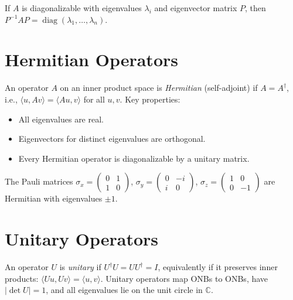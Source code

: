 \begin{example}
If $A$ is diagonalizable with eigenvalues $\lambda_i$ and eigenvector matrix $P$, then $P^{-1}AP = \operatorname{diag}(\lambda_1,\ldots,\lambda_n)$.
\end{example}

\section{Hermitian Operators}
\label{sec:hermitian-ops}

An operator $A$ on an inner product space is \emph{Hermitian} (self-adjoint) if $A=A^\dagger$, i.e., $\langle u,Av\rangle = \langle Au,v\rangle$ for all $u,v$. Key properties:
\begin{itemize}
  \item All eigenvalues are real.
  \item Eigenvectors for distinct eigenvalues are orthogonal.
  \item Every Hermitian operator is diagonalizable by a unitary matrix.
\end{itemize}

\begin{example}
The Pauli matrices $\sigma_x=\begin{pmatrix}0&1\\1&0\end{pmatrix}$, $\sigma_y=\begin{pmatrix}0&-i\\i&0\end{pmatrix}$, $\sigma_z=\begin{pmatrix}1&0\\0&-1\end{pmatrix}$ are Hermitian with eigenvalues $\pm1$.
\end{example}

\section{Unitary Operators}
\label{sec:unitary-ops}

An operator $U$ is \emph{unitary} if $U^\dagger U = UU^\dagger = I$, equivalently if it preserves inner products: $\langle Uu, Uv\rangle=\langle u,v\rangle$. Unitary operators map ONBs to ONBs, have $|\det U|=1$, and all eigenvalues lie on the unit circle in $\mathbb{C}$.

